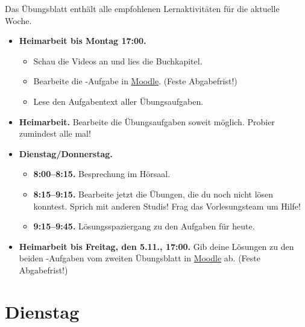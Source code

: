 \documentclass{uebung_cs}
\begin{document}
Das Übungsblatt enthält alle empfohlenen Lernaktivitäten für die aktuelle Woche.

\begin{itemize}
\item \textbf{Heimarbeit bis Montag 17:00.}
    \begin{itemize}
    \item 
    Schau die Videos an und lies die Buchkapitel.
    \item Bearbeite die -Aufgabe in \href{https://moodle.studiumdigitale.uni-frankfurt.de/moodle/course/view.php?id=2241}{Moodle}. (Feste Abgabefrist!)
    \item Lese den Aufgabentext aller Übungsaufgaben.
    \end{itemize}
\item \textbf{Heimarbeit.} Bearbeite die Übungsaufgaben soweit möglich. Probier zumindest alle mal!
\item \textbf{Dienstag/Donnerstag.}
\begin{itemize}
    \item \textbf{8:00--8:15.} Besprechung im Hörsaal.
    \item \textbf{8:15--9:15.} Bearbeite jetzt die Übungen, die du noch nicht lösen konntest. Sprich mit anderen Studis! Frag das Vorlesungsteam um Hilfe!
    \item \textbf{9:15--9:45.} Lösungsspaziergang zu den Aufgaben für heute.
\end{itemize}

\item \textbf{Heimarbeit bis Freitag, den 5.11., 17:00.} Gib deine Lösungen zu den beiden -Aufgaben vom zweiten Übungsblatt in \href{https://moodle.studiumdigitale.uni-frankfurt.de/moodle/course/view.php?id=2241}{Moodle} ab. (Feste Abgabefrist!)
\end{itemize}

\section*{Dienstag}
\end{document}
